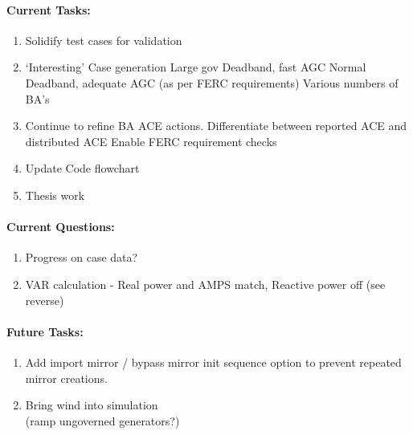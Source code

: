 \documentclass[12pt]{article}
\begin{document}
\begin{multicols}{2}
\paragraph{Current Tasks:}
	\begin{enumerate}
		\itemsep0em 
		\item Solidify test cases for validation
		\item `Interesting' Case generation
\subitem Large gov Deadband, fast AGC
\subitem Normal Deadband, adequate AGC (as per FERC requirements)
\subitem Various numbers of BA's 
		\item Continue to refine BA ACE actions.
\subitem Differentiate between reported ACE and distributed ACE
\subitem Enable FERC requirement checks
		\item Update Code flowchart%
		\item Thesis work 
		

	\end{enumerate}

\vfill\null
\columnbreak

	\paragraph{Current Questions:}
	\begin{enumerate}
\itemsep0em 
	\item Progress on case data?
	\item VAR calculation - Real power and AMPS match, Reactive power off (see reverse)
	\end{enumerate}
	




\paragraph{Future Tasks:} %
	\begin{enumerate}
		
		\item Add import mirror / bypass mirror init sequence option to prevent repeated mirror creations.

		\item Bring wind into simulation \\ (ramp ungoverned generators?)



\end{enumerate}
\end{multicols}
\end{document}
